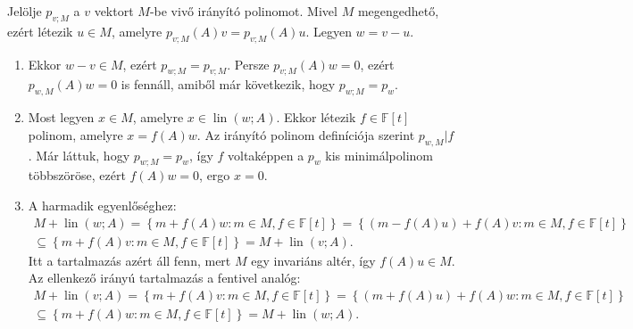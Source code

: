 \documentclass[9pt, a4paper, showtrims]{memoir}
\makeatletter
\renewenvironment{proof}[1][\proofname]
    {\par\pushQED{\qed}%
    \normalfont \topsep6\p@\@plus6\p@\relax
    \trivlist
    \item[\hskip\labelsep
        \itshape
    #1\@addpunct{:}]\ignorespaces}
    {\popQED\endtrivlist\@endpefalse}
\theoremstyle{plain}
\theoremstyle{remark}
\theoremstyle{definition}
\DeclareMathOperator{\lin}{lin}
\makeatother
\begin{document}
\begin{proof}
    Jelölje $p_{v;M}$ a $v$ vektort $M$-be vivő irányító polinomot.
    Mivel $M$ megengedhető, ezért létezik $u\in M$, amelyre $p_{ v;M}\left( A \right)v=p_{v;M}\left( A \right)u$. 
    Legyen $w=v-u$.
    \begin{enumerate}
        \item 
        Ekkor $w-v\in M$, ezért $p_{w;M}=p_{v;M}$. 
        Persze $p_{v;M}\left( A \right)w=0$,
        ezért $p_{w,M}\left( A \right)w=0$ is fennáll,
        amiből már következik, hogy $p_{w;M}=p_w$.

        \item
        Most legyen $x\in M$, amelyre $x\in\lin\left( w;A \right)$. 
        Ekkor létezik $f\in\mathbb{F}\left[ t \right]$ polinom, amelyre
        \(
            x=f\left( A \right)w.
        \)
        Az irányító polinom definíciója szerint $p_{w,M}|f$.
        Már láttuk, hogy $p_{w;M}=p_w$, így $f$ voltaképpen a $p_w$ kis minimálpolinom többszöröse, 
        ezért $f\left( A \right)w=0$, 
        ergo $x=0$.

        \item
        A harmadik egyenlőséghez:
        \begin{multline*}
            M+\lin\left( w;A \right)
            =
            \left\{ m+f\left( A \right)w:m\in M, f\in\mathbb{F}\left[ t \right] \right\}
            =
            \left\{ \left( m-f\left( A \right)u \right)+f\left( A \right)v:m\in M, f\in\mathbb{F}\left[ t \right] \right\}\\
            \subseteq
            \left\{ m+f\left( A \right)v:m\in M, f\in\mathbb{F}\left[ t \right] \right\}
            =
            M+\lin\left( v;A \right).
        \end{multline*}
        Itt a tartalmazás azért áll fenn, mert $M$ egy invariáns altér, így $f\left( A \right)u\in M$.
        Az ellenkező irányú tartalmazás a fentivel analóg:
        \begin{multline*}
            M+\lin\left( v;A \right)
            =
            \left\{ m+f\left( A \right)v:m\in M, f\in\mathbb{F}\left[ t \right] \right\}
            =
            \left\{ \left( m+f\left( A \right)u \right)+f\left( A \right)w:m\in M, f\in\mathbb{F}\left[ t \right] \right\}\\
            \subseteq
            \left\{ m+f\left( A \right)w:m\in M, f\in\mathbb{F}\left[ t \right] \right\}
            =
            M+\lin\left( w;A \right).
        \end{multline*}\qedhere
    \end{enumerate}
\end{proof}
\end{document}
